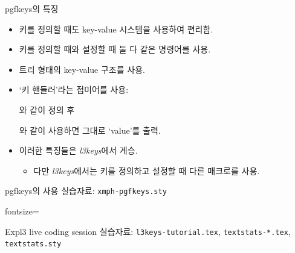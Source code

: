 \documentclass[compress]{beamer}
\newcommand\seefile[1]{%
  {\tiny 실습자료: \texttt{#1}}%
}
\begin{document}
\begin{frame}[fragile=singleslide]{pgfkeys의 특징}
  \begin{itemize}
    \item 키를 정의할 때도 key-value 시스템을 사용하여 편리함.
    \item 키를 정의할 때와 설정할 때 둘 다 같은 명령어를 사용.
    \item 트리 형태의 key-value 구조를 사용.
    \item `키 핸들러'라는 접미어를 사용:
      \begin{latexcode}
      \end{latexcode}
      와 같이 정의 후
      \begin{latexcode}
      \end{latexcode}
      와 같이 사용하면 그대로 `value'를 출력.
    \item 이러한 특징들은 \textsl{l3keys}에서 계승.
      \begin{itemize}
        \item 다만 \textsl{l3keys}에서는 키를 정의하고 설정할 때 다른 매크로를 사용.
      \end{itemize}
  \end{itemize}
\end{frame}

\begin{frame}[fragile=singleslide]{pgfkeys의 사용}
  \seefile{xmph-pgfkeys.sty}

  \begin{latexcode*}{fontsize=\tiny}
    \newif\ifxmph@useitalic
    \newif\ifxmph@usebold
    \newif\ifxmph@usecolour
    \ProcessPgfOptions*
  \end{latexcode*}
\end{frame}

\begin{frame}[fragile=singleslide]{Expl3 live coding session}
  실습자료: \texttt{l3keys-tutorial.tex}, \texttt{textstats-*.tex}, \texttt{textstats.sty}
\end{frame}
\end{document}
